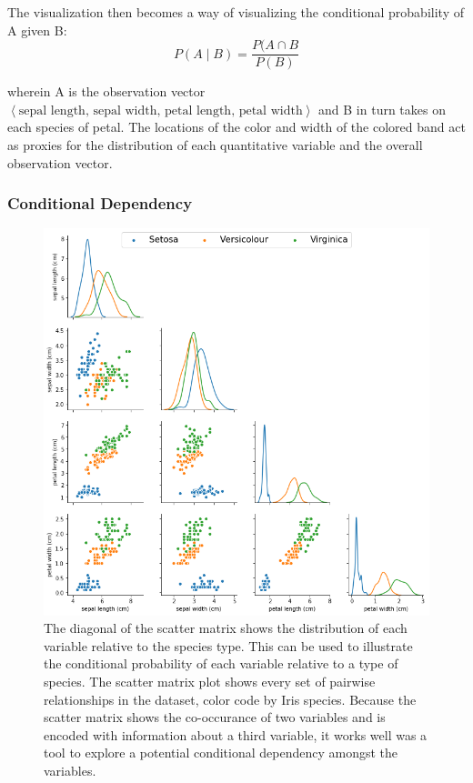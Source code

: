 \documentclass[letterpaper,onecolumn,titlepage]{Ythesis}
\begin{document}
The visualization then becomes a way of visualizing the conditional probability of A given B:
\begin{equation}
P(A\mid B) = \frac{P(A \cap B}{P(B)} 
\end{equation}

wherein A is the observation vector $\left< \text{sepal length, sepal width, petal length, petal width} \right>$ and B in turn takes on each species of petal. The locations of the color and width of the colored band act as proxies for the distribution of each quantitative variable and the overall observation vector. 

\subsubsection{Conditional Dependency}
\begin{figure}
\includegraphics[width=\textwidth]{intro/iris_observations.png}
\caption{The diagonal of the scatter matrix shows the distribution of each variable relative to the species type. This can be used to illustrate the conditional probability of each variable relative to a type of species. The scatter matrix plot shows every set of pairwise relationships in the dataset, color code by Iris species. Because the scatter matrix shows the co-occurance of two variables and is encoded with information about a third variable, it works well was a tool to explore a potential conditional dependency amongst the variables.}
\label{fig:iris_observations}
\end{figure}
\end{document}

